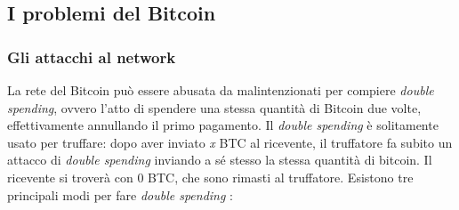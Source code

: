 \documentclass {article}
\begin{document}
\subsection {I problemi del Bitcoin}


\subsubsection {Gli attacchi al network}


La rete del Bitcoin può essere abusata da malintenzionati per compiere \textit{double spending}, ovvero l'atto di spendere una stessa quantità di Bitcoin due volte, effettivamente annullando il primo pagamento.
Il \textit{double spending} è solitamente usato per truffare: dopo aver inviato \textit{x} BTC al ricevente, il truffatore fa subito un attacco di \textit{double spending} inviando a sé stesso la stessa quantità di bitcoin. Il ricevente si troverà con 0 BTC, che sono rimasti al truffatore.
Esistono tre principali modi per fare \textit{double spending} \cite{attacks}:
\end{document}
